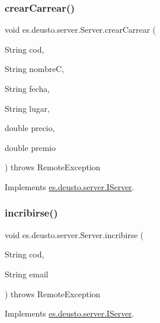 \mbox{\label{classes_1_1deusto_1_1server_1_1_server_a22d31cd9642f978f1995fc7822d99258}} 
\subsubsection{\texorpdfstring{crearCarrear()}{crearCarrear()}}
{\footnotesize\ttfamily void es.\+deusto.\+server.\+Server.\+crear\+Carrear (\begin{DoxyParamCaption}\item[{String}]{cod,  }\item[{String}]{nombreC,  }\item[{String}]{fecha,  }\item[{String}]{lugar,  }\item[{double}]{precio,  }\item[{double}]{premio }\end{DoxyParamCaption}) throws Remote\+Exception}



Implements \mbox{\hyperlink{interfacees_1_1deusto_1_1server_1_1_i_server_a3cb0049dde89f2d81fcc883b19a0c6cf}{es.\+deusto.\+server.\+I\+Server}}.

\mbox{\label{classes_1_1deusto_1_1server_1_1_server_a19df52b26da7c83b2e7f13a6aab45633}} 
\subsubsection{\texorpdfstring{incribirse()}{incribirse()}}
{\footnotesize\ttfamily void es.\+deusto.\+server.\+Server.\+incribirse (\begin{DoxyParamCaption}\item[{String}]{cod,  }\item[{String}]{email }\end{DoxyParamCaption}) throws Remote\+Exception}



Implements \mbox{\hyperlink{interfacees_1_1deusto_1_1server_1_1_i_server_ab6f6b6b646a79a330ab0b2174d77db44}{es.\+deusto.\+server.\+I\+Server}}.

